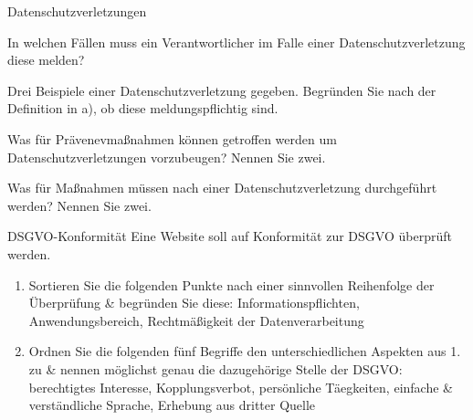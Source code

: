 \documentclass{exercisesheet}
\begin{document}
\begin{exercise}{Datenschutzverletzungen}
  \item In welchen Fällen muss ein Verantwortlicher im Falle einer Datenschutzverletzung diese melden?
  \item Drei Beispiele einer Datenschutzverletzung gegeben. Begründen Sie nach der Definition in a), ob diese meldungspflichtig sind.
  \item Was für Prävenevmaßnahmen können getroffen werden um Datenschutzverletzungen vorzubeugen? Nennen Sie zwei.
  \item Was für Maßnahmen müssen nach einer Datenschutzverletzung durchgeführt werden? Nennen Sie zwei.
\end{exercise}

\begin{exercise*}{DSGVO-Konformität}
  Eine Website soll auf Konformität zur DSGVO überprüft werden.
  \begin{enumerate}
    \item Sortieren Sie die folgenden Punkte nach einer sinnvollen Reihenfolge der Überprüfung \& begründen Sie diese: Informationspflichten, Anwendungsbereich, Rechtmäßigkeit der Datenverarbeitung
    \item Ordnen Sie die folgenden fünf Begriffe den unterschiedlichen Aspekten aus 1. zu \& nennen möglichst genau die dazugehörige Stelle der DSGVO: berechtigtes Interesse, Kopplungsverbot, persönliche Täegkeiten, einfache \& verständliche Sprache, Erhebung aus dritter Quelle
  \end{enumerate}
\end{exercise*}
\end{document}
